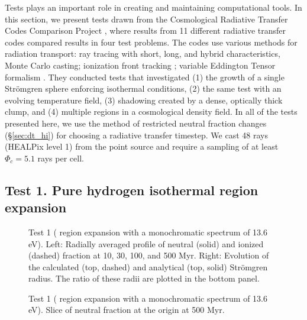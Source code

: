 \documentclass[apj,onecolumn]{emulateapj}
\begin{document}
Tests plays an important role in creating and maintaining
computational tools.  In this section, we present tests drawn from the
Cosmological Radiative Transfer Codes Comparison Project \citep{RT06},
where results from 11 different radiative transfer codes compared
results in four test problems.  The codes use various methods for
radiation transport: ray tracing with short, long, and hybrid
characteristics, Monte Carlo casting; ionization front tracking
\citep{Alvarez06_IFT}; variable Eddington Tensor formalism
\citep{Gnedin01_OTVET}.  They conducted tests that investigated (1)
the growth of a single Str\"{o}mgren sphere enforcing isothermal
conditions, (2) the same test with an evolving temperature field, (3)
shadowing created by a dense, optically thick clump, and (4) multiple
 regions in a cosmological density field.  In all of the
tests presented here, we use the method of restricted neutral fraction
changes (\S\ref{sec:dt_hi}) for choosing a radiative transfer
timestep.  We cast 48 rays (HEALPix level 1) from the point source and
require a sampling of at least $\Phi_c = 5.1$ rays per cell.

\subsection{Test 1. Pure hydrogen isothermal  region
  expansion}
\label{sec:test1}

\begin{figure}[t]
  \caption{\label{fig:test1_ifront} Test 1 ( region
    expansion with a monochromatic spectrum of 13.6 eV).  Left:
    Radially averaged profile of neutral (solid) and ionized (dashed)
    fraction at 10, 30, 100, and 500 Myr.  Right: Evolution of the
    calculated (top, dashed) and analytical (top, solid) Str\"{o}mgren
    radius.  The ratio of these radii are plotted in the bottom panel.}
\end{figure}

\begin{figure}[t]
  \caption{\label{fig:test1_HI} Test 1 ( region expansion
    with a monochromatic spectrum of 13.6 eV). Slice of neutral
    fraction at the origin at 500 Myr.}
\end{figure}
\end{document}
